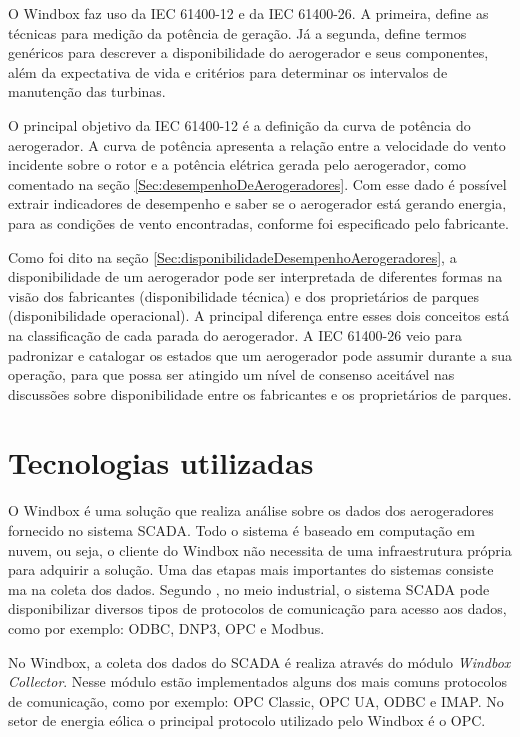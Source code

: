 O Windbox faz uso da IEC 61400-12 e da IEC 61400-26. A primeira, define as técnicas para medição da potência de geração. Já a segunda, define termos genéricos para descrever a disponibilidade do aerogerador e seus componentes, além da expectativa de vida e critérios para determinar os intervalos de manutenção das turbinas.   

O principal objetivo da IEC 61400-12 é a definição da curva de potência do aerogerador. A curva de potência apresenta a relação entre a velocidade do vento incidente sobre o rotor e a potência elétrica gerada pelo aerogerador, como comentado na seção \ref{Sec:desempenhoDeAerogeradores}. Com esse dado é possível extrair indicadores de desempenho e saber se o aerogerador está gerando energia, para as condições de vento encontradas, conforme foi especificado pelo fabricante.

Como foi dito na seção \ref{Sec:disponibilidadeDesempenhoAerogeradores}, a disponibilidade de um aerogerador pode ser interpretada de diferentes formas na visão dos fabricantes (disponibilidade técnica) e dos proprietários de parques (disponibilidade operacional). A principal diferença entre esses dois conceitos está na classificação de cada parada do aerogerador. A IEC 61400-26 veio para padronizar e catalogar os estados que um aerogerador pode assumir  durante a sua operação, para que possa ser atingido um nível de consenso aceitável nas discussões sobre disponibilidade entre os fabricantes e os proprietários de parques.

\section{Tecnologias utilizadas}
\label{Sec:tecnologias}


O Windbox é uma solução que realiza análise sobre os dados dos aerogeradores fornecido no sistema SCADA. Todo o sistema é baseado em computação em nuvem, ou seja, o cliente do Windbox não necessita de uma infraestrutura própria para adquirir a solução. Uma das etapas mais importantes do sistemas consiste ma na coleta dos dados. Segundo , no meio industrial, o sistema SCADA pode disponibilizar diversos tipos de protocolos de comunicação para acesso aos dados, como por exemplo: ODBC, DNP3, OPC e Modbus. 

No Windbox, a coleta dos dados do SCADA é realiza através do módulo \textit{Windbox Collector}. Nesse módulo estão implementados alguns dos mais comuns protocolos de comunicação, como por exemplo: OPC Classic, OPC UA, ODBC e IMAP. No setor de energia eólica o principal protocolo utilizado pelo Windbox é o OPC.

